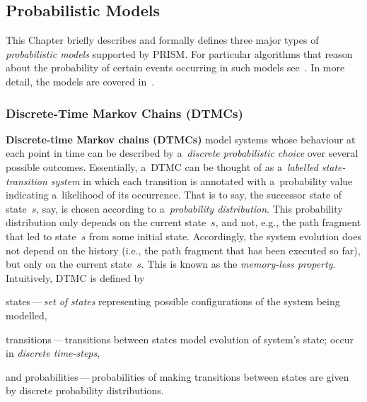 \documentclass[a4paper, 11pt]{article}
\theoremstyle{definition}
\begin{document}
\subsection{Probabilistic Models}
\label{sec:probModels}

This Chapter briefly describes and formally defines three major types of
\emph{probabilistic models} supported by PRISM. For particular algorithms
that reason about the  probability of certain events occurring in such models
see~\cite{automatedVerForProbSys, stochModelCheck}. In more detail, the
models are covered in~\cite{principlesOfModelCheck, handbookOfModelCheck,
automatedVerForProbSys, stochModelCheck}.

\subsubsection{Discrete-Time Markov Chains (DTMCs)}

\textbf{Discrete-time Markov chains (DTMCs)} model systems whose behaviour
at each point in time can be described by a~\emph{discrete probabilistic
choice} over several possible outcomes. Essentially, a~DTMC can be thought
of as a~\emph{labelled state-transition system} in which each transition is
annotated with a~probability value indicating a~likelihood of its occurrence.
That is to say, the successor state of state~$ s $, say, is chosen according
to a~\emph{probability distribution}. This probability distribution only
depends on the current state~$ s $, and not, e.g., the path fragment that
led to state~$ s $ from some initial state. Accordingly, the system
evolution does not depend on the history (i.e., the path fragment that
has been executed so far), but only on the current state~$ s $. This is
known as the \emph{memory-less property}. Intuitively, DTMC is defined by
\begin{enumerate*}[label={(\roman*)}]
    \item
        states\,---\,\emph{set of states} representing possible
        configurations of the system being modelled,

    \item
        transitions\,---\,transitions between states model evolution of
        system's state; occur in \emph{discrete time-steps},

    \item
        and probabilities\,---\,probabilities of making transitions
        between states are given by discrete probability distributions.
\end{enumerate*}
\end{document}
